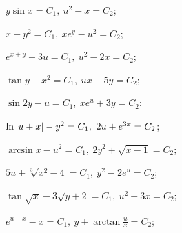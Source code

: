 \begin{enumsols}
		\label{sol:nonlinsys_systodes:symmetrical2hard}
		\item \( y \sin{x} = C_1, ~ u^2 - x = C_2 \); \sfill %
		\item \( x + y^2 = C_1, ~ xe^y - u^2 = C_2 \); \sfill %
		\item \( e^{x + y} - 3u = C_1, ~ u^2 - 2x = C_2 \); \sfill %
		\item \( \tan{y} - x^2 = C_1, ~ ux - 5y = C_2 \); \sfill %
		\item \( \sin{2y} - u = C_1, ~ x e^u + 3y = C_2 \); \sfill %
		\item \( \ln{ \left\vert u + x \right\vert } - y^2 = C_1, ~ 2u + e^{3x} = C_2 \); \sfill %
		\item \( \arcsin{x} - u^2 = C_1, ~ 2 y^2 + \sqrt{x - 1} = C_2 \); \sfill %
		\item \( 5u + \sqrt[3]{x^2 - 4} = C_1, ~ y^2 - 2e^u = C_2 \); \sfill %
		\item \( \tan{\sqrt{x}} - 3 \sqrt{y + 2} = C_1, ~ u^2 - 3x = C_2 \); \sfill %
		\item \( e^{u - x} - x = C_1, ~ y + \arctan{\frac{u}{x}} = C_2 \); \sfill %


\end{enumsols}
